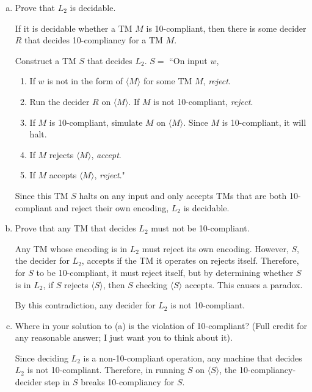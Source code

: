 \documentclass{article}
\begin{document}
    \begin{enumerate}[(a)]
        \item Prove that $L_2$ is decidable.

            If it is decidable whether a TM $M$ is 10-compliant, then there is some decider $R$ that decides 10-compliancy for a TM $M$.

            Construct a TM $S$ that decides $L_2$. $S = $ ``On input $w$,
            \begin{enumerate}[1.]
                \item If $w$ is not in the form of $\langle M \rangle$ for some TM $M$, \textit{reject}.

                \item Run the decider $R$ on $\langle M \rangle$. If $M$ is not 10-compliant, \textit{reject}.

                \item If $M$ is 10-compliant, simulate $M$ on $\langle M \rangle$. Since $M$ is 10-compliant, it will halt. 

                \item If $M$ rejects $\langle M \rangle$, \textit{accept}.

                \item If $M$ accepts $\langle M \rangle$, \textit{reject}."
            \end{enumerate}

            Since this TM $S$ halts on any input and only accepts TMs that are both 10-compliant and reject their own encoding, $L_2$ is decidable.

        \item Prove that any TM that decides $L_2$ must not be 10-compliant.

            Any TM whose encoding is in $L_2$ must reject its own encoding. However, $S$, the decider for $L_2$, accepts if the TM it operates on rejects itself. Therefore, for $S$ to be 10-compliant, it must reject itself, but by determining whether $S$ is in $L_2$, if $S$ rejects $\langle S \rangle$, then $S$ checking $\langle S \rangle$ accepts. This causes a paradox.

            By this contradiction, any decider for $L_2$ is not 10-compliant.

        \item Where in your solution to (a) is the violation of 10-compliant? (Full credit for any reasonable answer; I just want you to think about it).

            Since deciding $L_2$ is a non-10-compliant operation, any machine that decides $L_2$ is not 10-compliant. Therefore, in running $S$ on $\langle S \rangle$, the 10-compliancy-decider step in $S$ breaks 10-compliancy for $S$.

    \end{enumerate}
\end{document}
